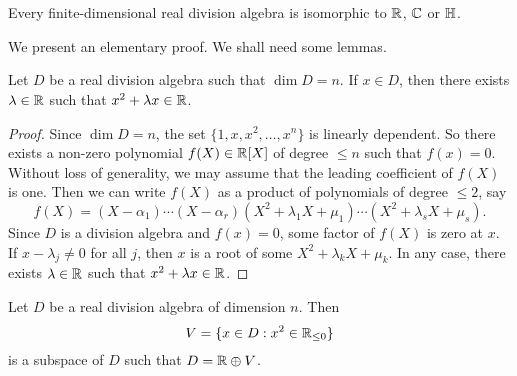 \chapter{}


\begin{theorem}[Frobenius]
	\label{thm:Frobenius}
	Every finite-dimensional real division algebra is isomorphic to $\mathbb{R}$, $\mathbb{C}$
	or $\mathbb{H}$.
\end{theorem}

We present an elementary proof. We shall need some lemmas. 

\begin{lemma}
	\label{lem:trick_frobenius1}
	Let $D$ be a real division algebra such that $\dim D=n$. If $x\in D$, then
	there exists $\lambda\in\mathbb{R}$ such that $x^2+\lambda x\in\mathbb{R}$.
\end{lemma}

\begin{proof}
	Since $\dim D=n$, the set $\{1,x,x^2,\dots,x^n\}$ is linearly dependent. So
	there exists a non-zero polynomial $f(X)\in\mathbb{R}[X]$ of degree $\leq n$ such
	that $f(x)=0$. Without loss of generality, we may assume that the leading
	coefficient of $f(X)$ is one. Then we can write $f(X)$ as a product of
	polynomials of degree $\leq2$, say 
	\[
		f(X)=(X-\alpha_1)\cdots (X-\alpha_r)(X^2+\lambda_1 X+\mu_1)\cdots (X^2+\lambda_s X+\mu_s).
	\]
	Since $D$ is a division algebra and $f(x)=0$, some factor of $f(X)$ is
	zero at $x$. If $x-\lambda_j\ne 0$ for all $j$, then $x$ is a root of some
	$X^2+\lambda_k X+\mu_k$. In any case, there exists $\lambda\in\mathbb{R}$ such that
	$x^2+\lambda x\in\mathbb{R}$. 
\end{proof}

\begin{lemma}
	\label{lem:trick_frobenius2}
	Let $D$ be a real division algebra of dimension $n$. Then
	\[
		V=\{x\in D:x^2\in\mathbb{R}_{\leq0}\}
	\]
	is a subspace of $D$ such that $D=\mathbb{R}\oplus V$.
\end{lemma}


